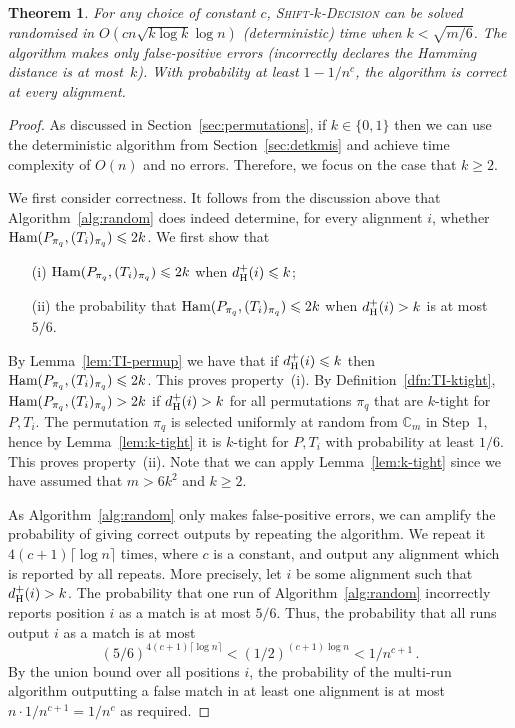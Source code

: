 \documentclass[11pt]{article}
\renewcommand{\geq}{\geqslant}
\renewcommand{\leq}{\leqslant}
\newcommand{\ham}{\ensuremath{\textup{Ham}}}
\newcommand{\Fam}{\ensuremath{\mathbb{C}_m}}
\newcommand{\DsHam}{\ensuremath{d_\textup{H}^+}}
\newcommand{\skDecision}{\textsc{Shift-$k$-Decision}\xspace}
\newcommand{\dHam}{\DsHam}
\theoremstyle{plain}
\newtheorem{theorem}{Theorem}[]
\theoremstyle{definition}
\begin{document}
\begin{theorem}
    \label{thm:rankmis}
    For any choice of constant $c$, \skDecision can be solved randomised in $O(cn \sqrt{k \log k}\log n)$ (deterministic) time when $k< \sqrt{m/6}$. The algorithm makes only false-positive errors (incorrectly declares the Hamming distance is at most~$k$). With probability at least $1-1/n^c$, the algorithm is correct at every alignment.
\end{theorem}
\begin{proof}
    As discussed in Section~\ref{sec:permutations}, if $k\in \{0,1\}$ then we can use the deterministic algorithm from Section~\ref{sec:detkmis} and achieve time complexity of $O(n)$ and no errors. Therefore, we focus on the case that $k\geq 2$.

    We first consider correctness. It follows from the discussion above that Algorithm~\ref{alg:random} does indeed determine, for every alignment $i$, whether $\ham(P_{\pi_q},(T_i)_{\pi_q}) \leq 2k$. We first show that
\begin{enumerate}
        \item[(i)] $\ham(P_{\pi_q},(T_i)_{\pi_q}) \leq 2k$ when $\dHam(i) \leq k$;
        \item[(ii)] the probability that $\ham(P_{\pi_q},(T_i)_{\pi_q}) \leq 2k$ when $\dHam(i) > k$  is at most $5/6$.
    \end{enumerate}

    By Lemma~\ref{lem:TI-permup} we have that if $\dHam(i) \leq k$ then $\ham(P_{\pi_q},(T_i)_{\pi_q}) \leq 2k$. This proves property~(i). By Definition~\ref{dfn:TI-ktight}, $\ham(P_{\pi_q},(T_i)_{\pi_q}) > 2k$ if $\dHam(i) > k$ for all permutations $\pi_q$ that are $k$-tight for $P,T_i$. The permutation $\pi_q$ is selected uniformly at random from $\Fam$ in Step~1, hence by Lemma~\ref{lem:k-tight} it is $k$-tight for $P,T_i$ with probability at least $1/6$. This proves property~(ii). Note that we can apply Lemma~\ref{lem:k-tight} since we have assumed that $m>6k^2$ and $k\geq 2$.

    As Algorithm~\ref{alg:random} only makes false-positive errors, we can amplify the probability of giving correct outputs by repeating the algorithm. We repeat it $4(c+1) \lceil \log n \rceil$ times, where $c$ is a constant, and output any alignment which is reported by all repeats. More precisely, let $i$ be some alignment such that $\dHam(i) > k$. The probability that one run of Algorithm~\ref{alg:random} incorrectly reports position $i$ as a match is at most $5/6$. Thus, the probability that all runs output $i$ as a match is at most
\begin{equation*}
        (5/6)^{4(c+1)\lceil \log n \rceil}<(1/2)^{(c+1)\log n}<1/n^{c+1} \,.
    \end{equation*}
By the union bound over all positions $i$, the probability of the multi-run algorithm outputting a false match in at least one alignment is at most $n \cdot 1/n^{c+1}= 1/n^c$ as required.


\end{proof}
\end{document}
